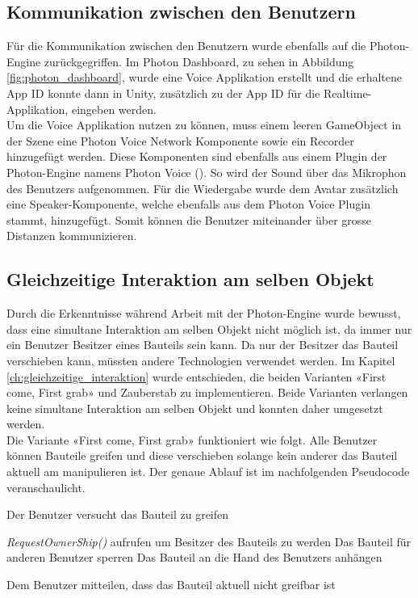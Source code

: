 \subsection{Kommunikation zwischen den Benutzern}
\label{ch:kommunikation_zwischen_benutzern_realisierung}
Für die Kommunikation zwischen den Benutzern wurde ebenfalls auf die Photon-Engine zurückgegriffen. Im Photon Dashboard, zu sehen in Abbildung \ref{fig:photon_dashboard}, wurde eine Voice Applikation erstellt und die erhaltene App ID konnte dann in Unity, zusätzlich zu der App ID für die Realtime-Applikation, eingeben werden. \\

\noindent Um die Voice Applikation nutzen zu können, muss einem leeren GameObject in der Szene eine \grqq Photon Voice Network\grqq{} Komponente sowie ein \grqq Recorder\grqq{} hinzugefügt werden. Diese Komponenten sind ebenfalls aus einem Plugin der Photon-Engine namens Photon Voice (\cite{noauthor_photon_2019-1}). So wird der Sound über das Mikrophon des Benutzers aufgenommen. Für die Wiedergabe wurde dem Avatar zusätzlich eine \grqq Speaker\grqq{}-Komponente, welche ebenfalls aus dem Photon Voice Plugin stammt, hinzugefügt. Somit können die Benutzer miteinander über grosse Distanzen kommunizieren. 

\subsection{Gleichzeitige Interaktion am selben Objekt}
\label{ch:gleichzeitige_interaktion_realisierung}

Durch die Erkenntnisse während Arbeit mit der Photon-Engine wurde bewusst, dass eine simultane Interaktion am selben Objekt nicht möglich ist, da immer nur ein Benutzer Besitzer eines Bauteils sein kann. Da nur der Besitzer das Bauteil verschieben kann, müssten andere Technologien verwendet werden. Im Kapitel \ref{ch:gleichzeitige_interaktion} wurde entschieden, die beiden Varianten «First come, First grab» und Zauberstab zu implementieren. Beide Varianten verlangen keine simultane Interaktion am selben Objekt und konnten daher umgesetzt werden. \\

\noindent Die Variante «First come, First grab» funktioniert wie folgt. Alle Benutzer können Bauteile greifen und diese verschieben solange kein anderer das Bauteil aktuell am manipulieren ist. Der genaue Ablauf ist im nachfolgenden Pseudocode veranschaulicht.

\begin{algorithm}
	Der Benutzer versucht das Bauteil zu greifen\;
	 {
		\textit{RequestOwnerShip()} aufrufen um Besitzer des Bauteils zu werden\;
		Das Bauteil für anderen Benutzer sperren\;
		Das Bauteil an die Hand des Benutzers anhängen\;
		
	}{
		Dem Benutzer mitteilen, dass das Bauteil aktuell nicht greifbar ist\;	
	}
\end{algorithm}


